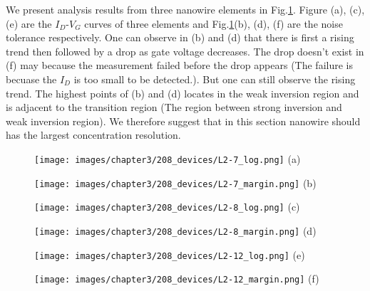 We present analysis results from three nanowire elements in Fig.\ref{fig:SD_Device}.
Figure (a), (c), (e) are the $I_D$-$V_G$ curves of three elements and Fig.\ref{fig:SD_Device}(b), (d), (f) are the noise tolerance respectively.
One can observe in (b) and (d) that there is first a rising trend then followed by a drop as gate voltage decreases.
The drop doesn't exist in (f) may because the measurement failed before the drop appears (The failure is becuase the $I_D$ is too small to be detected.).
But one can still observe the rising trend.
The highest points of (b) and (d) locates in the weak inversion region and is adjacent to the transition region (The region between strong inversion and weak inversion region).
We therefore suggest that in this section nanowire should has the largest concentration resolution.



\begin{figure}[h!]
    \centering
    \begin{minipage}[t][20cm][t]{1\textwidth}
        \begin{minipage}[t]{0.3\textwidth}
            \centering
            \texttt{[image: images/chapter3/208\_devices/L2-7\_log.png]}
            (a)
        \end{minipage}
        \hfill
        \begin{minipage}[t]{0.3\textwidth}
            \centering
            \texttt{[image: images/chapter3/208\_devices/L2-7\_margin.png]}
            (b)
        \end{minipage}
        \vfill
        \begin{minipage}[t]{0.3\textwidth}
            \centering
            \texttt{[image: images/chapter3/208\_devices/L2-8\_log.png]}
            (c)
        \end{minipage}
        \hfill
        \begin{minipage}[t]{0.3\textwidth}
            \centering
            \texttt{[image: images/chapter3/208\_devices/L2-8\_margin.png]}
            (d)
        \end{minipage}
        \vfill
        \begin{minipage}[t]{0.3\textwidth}
            \centering
            \texttt{[image: images/chapter3/208\_devices/L2-12\_log.png]}
            (e)
        \end{minipage}
        \hfill
        \begin{minipage}[t]{0.3\textwidth}
            \centering
            \texttt{[image: images/chapter3/208\_devices/L2-12\_margin.png]}
            (f)
        \end{minipage}

    \end{minipage}
    \caption{}
    \label{fig:SD_Device}
\end{figure}
\FloatBarrier

